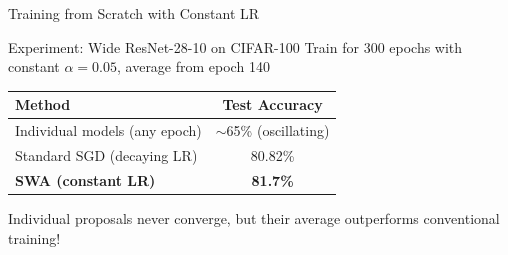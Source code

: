 \documentclass{beamer}
\begin{document}
\begin{frame}{Training from Scratch with Constant LR}


\begin{block}{Experiment: Wide ResNet-28-10 on CIFAR-100}
Train for 300 epochs with constant $\alpha=0.05$, average from epoch 140
\end{block}

\vspace{0.5cm}

\begin{table}
\centering
\begin{tabular}{lc}
\toprule
\textbf{Method} & \textbf{Test Accuracy} \\
\midrule
Individual models (any epoch) & $\sim$65\% (oscillating) \\
Standard SGD (decaying LR) & 80.82\% \\
\textbf{SWA (constant LR)} & \textbf{81.7\%} \\
\bottomrule
\end{tabular}
\end{table}

\vspace{0.3cm}

Individual proposals never converge, but their average outperforms conventional training!

\end{frame}
\end{document}
